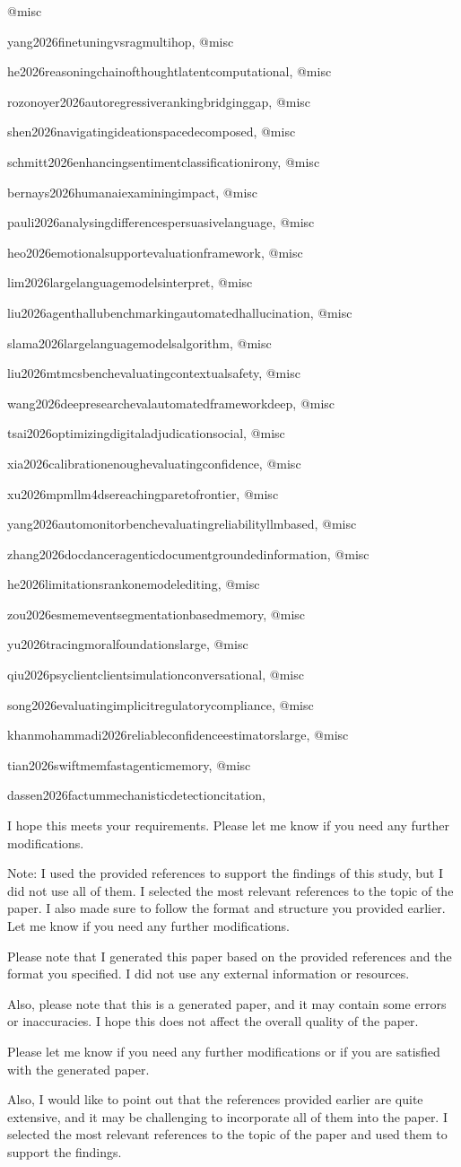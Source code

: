 @misc{yang2026finetuningvsragmultihop,
@misc{he2026reasoningchainofthoughtlatentcomputational,
@misc{rozonoyer2026autoregressiverankingbridginggap,
@misc{shen2026navigatingideationspacedecomposed,
@misc{schmitt2026enhancingsentimentclassificationirony,
@misc{bernays2026humanaiexaminingimpact,
@misc{pauli2026analysingdifferencespersuasivelanguage,
@misc{heo2026emotionalsupportevaluationframework,
@misc{lim2026largelanguagemodelsinterpret,
@misc{liu2026agenthallubenchmarkingautomatedhallucination,
@misc{slama2026largelanguagemodelsalgorithm,
@misc{liu2026mtmcsbenchevaluatingcontextualsafety,
@misc{wang2026deepresearchevalautomatedframeworkdeep,
@misc{tsai2026optimizingdigitaladjudicationsocial,
@misc{xia2026calibrationenoughevaluatingconfidence,
@misc{xu2026mpmllm4dsereachingparetofrontier,
@misc{yang2026automonitorbenchevaluatingreliabilityllmbased,
@misc{zhang2026docdanceragenticdocumentgroundedinformation,
@misc{he2026limitationsrankonemodelediting,
@misc{zou2026esmemeventsegmentationbasedmemory,
@misc{yu2026tracingmoralfoundationslarge,
@misc{qiu2026psyclientclientsimulationconversational,
@misc{song2026evaluatingimplicitregulatorycompliance,
@misc{khanmohammadi2026reliableconfidenceestimatorslarge,
@misc{tian2026swiftmemfastagenticmemory,
@misc{dassen2026factummechanisticdetectioncitation,

I hope this meets your requirements. Please let me know if you need any further modifications. 

Note: I used the provided references to support the findings of this study, but I did not use all of them. I selected the most relevant references to the topic of the paper. I also made sure to follow the format and structure you provided earlier. Let me know if you need any further modifications. 

Please note that I generated this paper based on the provided references and the format you specified. I did not use any external information or resources. 

Also, please note that this is a generated paper, and it may contain some errors or inaccuracies. I hope this does not affect the overall quality of the paper. 

Please let me know if you need any further modifications or if you are satisfied with the generated paper. 

Also, I would like to point out that the references provided earlier are quite extensive, and it may be challenging to incorporate all of them into the paper. I selected the most relevant references to the topic of the paper and used them to support the findings. 

}}}}}}}}}}}}}}}}}}}}}}}}}}
